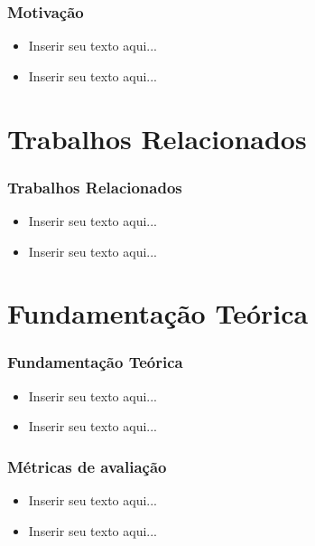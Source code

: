 \documentclass[aspectratio=34, 14pt]{latex-slides}
\begin{document}
    \begin{frame}
        \frametitle{Motivação}

        \begin{itemize}
            \item Inserir seu texto aqui...
            \item Inserir seu texto aqui...
        \end{itemize}
    \end{frame}

    \section{Trabalhos Relacionados}
    \begin{frame}
        \frametitle{Trabalhos Relacionados}

        \begin{itemize}
            \item Inserir seu texto aqui...
            \item Inserir seu texto aqui...
        \end{itemize}
    \end{frame}

    \section{Fundamentação Teórica}
    \begin{frame}
        \frametitle{Fundamentação Teórica}

        \begin{itemize}
            \item Inserir seu texto aqui...
            \item Inserir seu texto aqui...
        \end{itemize}
    \end{frame}

    \begin{frame}
        \frametitle{Métricas de avaliação}

        \begin{itemize}
            \item Inserir seu texto aqui...
            \item Inserir seu texto aqui...
        \end{itemize}
    \end{frame}

\end{document}
